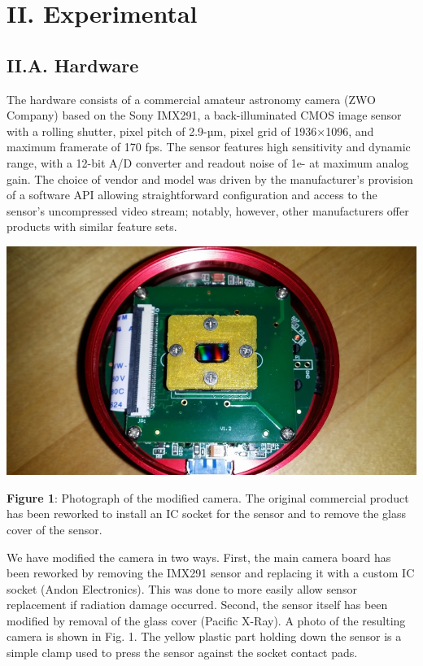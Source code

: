 \section{II. Experimental }

\subsection{II.A. Hardware}

The hardware consists of a commercial amateur astronomy camera (ZWO
Company) based on the Sony IMX291, a back-illuminated CMOS image sensor
with a rolling shutter, pixel pitch of 2.9-µm, pixel grid of 1936×1096,
and maximum framerate of 170 fps. The sensor features high sensitivity
and dynamic range, with a 12-bit A/D converter and readout noise of 1e-
at maximum analog gain. The choice of vendor and model was driven by the
manufacturer's provision of a software API allowing straightforward
configuration and access to the sensor's uncompressed video stream;
notably, however, other manufacturers offer products with similar
feature sets.

\begin{center}
\includegraphics{NewCameraPaper_1.10.docx1502867018/media/image1.jpeg}
\end{center}

\textbf{Figure 1}: Photograph of the modified camera. The original
commercial product has been reworked to install an IC socket for the
sensor and to remove the glass cover of the sensor.
\bigbreak

We have modified the camera in two ways. First, the main camera board
has been reworked by removing the IMX291 sensor and replacing it with a
custom IC socket (Andon Electronics). This was done to more easily allow
sensor replacement if radiation damage occurred. Second, the sensor
itself has been modified by removal of the glass cover (Pacific X-Ray).
A photo of the resulting camera is shown in Fig. 1. The yellow plastic
part holding down the sensor is a simple clamp used to press the sensor
against the socket contact pads.

